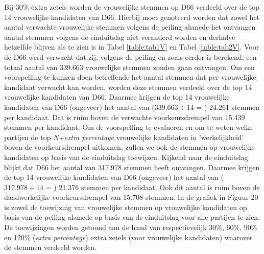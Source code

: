 \indent Bij 30\% extra zetels worden de vrouwelijke stemmen op D66 verdeeld over de top 14 vrouwelijke kandidaten van D66. Hierbij moet genoteerd worden dat zowel het aantal verwachte vrouwelijke stemmen volgens de peiling alsmede het ontvangen aantal stemmen volgens de einduitslag niet veranderd worden en derhalve hetzelfde blijven als te zien is in Tabel \ref{table:tab1V} en Tabel \ref{table:tab2V}. Voor de D66 werd verwacht dat zij, volgens de peiling en zoals eerder is berekend, een totaal aantal van 339.663 vrouwelijke stemmen zouden gaan ontvangen. Om een voorspelling te kunnen doen betreffende het aantal stemmen dat per vrouwelijke kandidaat verwacht kan worden, worden deze stemmen verdeeld over de top 14 vrouwelijke kandidaten van D66. Daarmee krijgen de top 14 vrouwelijke kandidaten van D66 (ongeveer) het aantal van ($339.663 \div 14$ = ) 24.261 stemmen per kandidaat. Dat is ruim boven de verwachte voorkeursdrempel van 15.439 stemmen per kandidaat.  Om de voorspelling te evalueren en om te weten welke partijen de top \textit{N+extra percentage} vrouwelijke kandidaten in 'werkelijkheid' boven de voorkeursdrempel uitkomen, zullen we ook de stemmen op vrouwelijke kandidaten op basis van de einduitslag toewijzen. Kijkend naar de einduitslag blijkt dat D66 het aantal van 317.978 stemmen heeft ontvangen. Daarmee krijgen de top 14 vrouwelijke kandidaten van D66 (ongeveer) het aantal van ($317.978 \div 14$ = ) 21.376 stemmen per kandidaat. Ook dit aantal is ruim boven de daadwerkelijke voorkeursdrempel van 15.708 stemmen. In de grafiek in Figuur 20 is zowel de toewijzing van vrouwelijke stemmen op vrouwelijke kandidaten op basis van de peiling alsmede op basis van de einduitslag voor alle partijen te zien. De toewijzingen worden getoond aan de hand van respectievelijk 30\%, 60\%, 90\% en 120\% (\textit{extra percentage}) extra zetels (voor vrouwelijke kandidaten) waarover de stemmen verdeeld worden.



